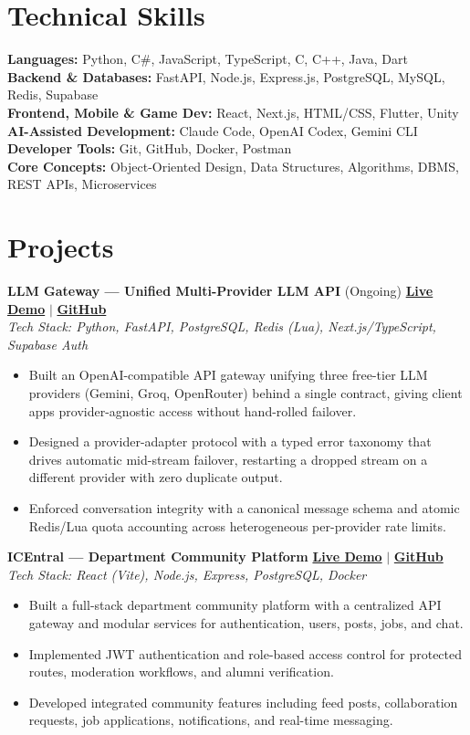 \documentclass[letterpaper,10pt]{article}
\newcommand{\entrygap}{\vspace{3pt}}
\begin{document}
\section*{Technical Skills}
\textbf{Languages:} Python, C\#, JavaScript, TypeScript, C, C++, Java, Dart \\
\textbf{Backend \& Databases:} FastAPI, Node.js, Express.js, PostgreSQL, MySQL, Redis, Supabase \\
\textbf{Frontend, Mobile \& Game Dev:} React, Next.js, HTML/CSS, Flutter, Unity \\
\textbf{AI-Assisted Development:} Claude Code, OpenAI Codex, Gemini CLI \\
\textbf{Developer Tools:} Git, GitHub, Docker, Postman \\
\textbf{Core Concepts:} Object-Oriented Design, Data Structures, Algorithms, DBMS, REST APIs, Microservices

\section*{Projects}
\textbf{LLM Gateway --- Unified Multi-Provider LLM API} (Ongoing) \hfill
\href{https://llm-gateway-project.vercel.app/}{\textbf{Live Demo}} $|$ \href{https://github.com/NightmareXIX/llm-gateway-project}{\textbf{GitHub}} \\
\textit{Tech Stack: Python, FastAPI, PostgreSQL, Redis (Lua), Next.js/TypeScript, Supabase Auth}
\begin{itemize}
    \item Built an OpenAI-compatible API gateway unifying three free-tier LLM providers (Gemini, Groq, OpenRouter) behind a single contract, giving client apps provider-agnostic access without hand-rolled failover.
    \item Designed a provider-adapter protocol with a typed error taxonomy that drives automatic mid-stream failover, restarting a dropped stream on a different provider with zero duplicate output.
    \item Enforced conversation integrity with a canonical message schema and atomic Redis/Lua quota accounting across heterogeneous per-provider rate limits.
\end{itemize}
\entrygap
\textbf{ICEntral --- Department Community Platform} \hfill
\href{https://icentral-official.pages.dev/home}{\textbf{Live Demo}} $|$ \href{https://github.com/NightmareXIX/icentral.git}{\textbf{GitHub}} \\
\textit{Tech Stack: React (Vite), Node.js, Express, PostgreSQL, Docker}
\begin{itemize}
    \item Built a full-stack department community platform with a centralized API gateway and modular services for authentication, users, posts, jobs, and chat.
    \item Implemented JWT authentication and role-based access control for protected routes, moderation workflows, and alumni verification.
    \item Developed integrated community features including feed posts, collaboration requests, job applications, notifications, and real-time messaging.
\end{itemize}
\end{document}
